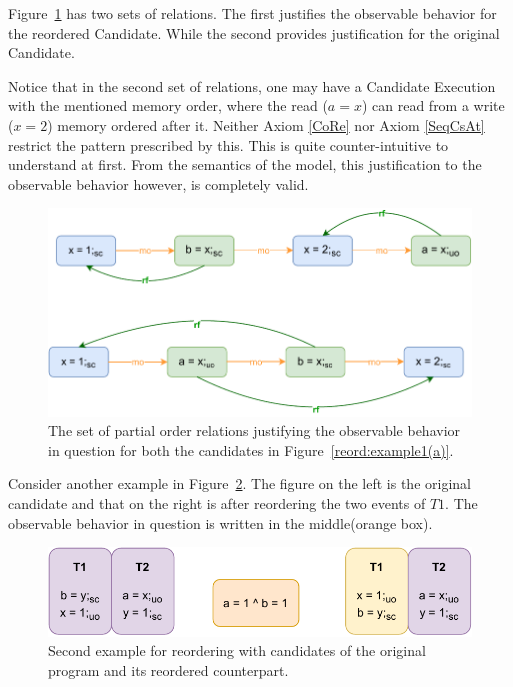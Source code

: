         Figure~\ref{reord:example1(b)} has two sets of relations. 
        The first justifies the observable behavior for the reordered Candidate. 
        While the second provides justification for the original Candidate. 
        
        Notice that in the second set of relations, one may have a Candidate Execution with the mentioned memory order, where the read ($a=x$) can read from a write ($x=2$) memory ordered after it. 
        Neither Axiom \ref{CoRe} nor Axiom \ref{SeqCsAt} restrict the pattern prescribed by this.
        This is quite counter-intuitive to understand at first. 
        From the semantics of the model, this justification to the observable behavior however, is completely valid\footnotemark. 
        \begin{figure}[H]
            \centering
            \includegraphics[scale=0.7]{4.InstructionReordering/0.Intro/ReorderingExample1(b).pdf}
            \caption{The set of partial order relations justifying the observable behavior in question for both the candidates in Figure~\ref{reord:example1(a)}.} 
            \label{reord:example1(b)}
        \end{figure}

        
        Consider another example in Figure~\ref{reord:example2(a)}.
        The figure on the left is the original candidate and that on the right is after reordering the two events of $T1$.
        The observable behavior in question is written in the middle(orange box). 
        \begin{figure}[H]
            \centering
            \includegraphics[scale=0.7]{4.InstructionReordering/0.Intro/ReorderingExample2(a).pdf}
            \caption{Second example for reordering with candidates of the original program and its reordered counterpart.} 
            \label{reord:example2(a)}
        \end{figure}
   
